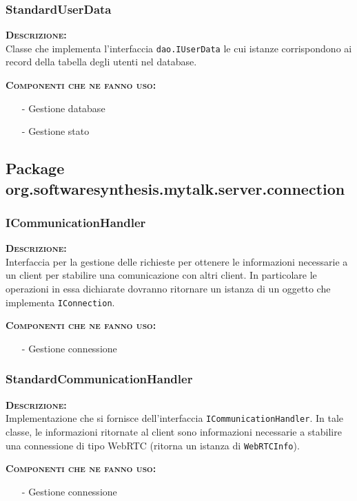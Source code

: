 \subsubsection{StandardUserData}
\begin{description}
	\item{\scshape\bfseries Descrizione:}\\
Classe che implementa l'interfaccia \texttt{dao.IUserData} le cui istanze corrispondono ai record della tabella degli utenti nel database.
	\item{\scshape\bfseries Componenti che ne fanno uso:}
	\begin{itemize}[noitemsep,nolistsep]
	  \item[-] Gestione database
	  \item[-] Gestione stato
	\end{itemize}
\end{description}

\subsection{Package org.softwaresynthesis.mytalk.server.connection}

\subsubsection{ICommunicationHandler}
\begin{description}
	\item{\scshape\bfseries Descrizione:}\\
Interfaccia per la gestione delle richieste per ottenere le informazioni necessarie a un client per stabilire una comunicazione con altri client. In particolare le operazioni in essa dichiarate dovranno ritornare un istanza di un oggetto che implementa \texttt{IConnection}.
	\item{\scshape\bfseries Componenti che ne fanno uso:}
		\begin{itemize}[noitemsep,nolistsep]
			\item[-] Gestione connessione
		\end{itemize}
\end{description}

\subsubsection{StandardCommunicationHandler}
\begin{description}
	\item{\scshape\bfseries Descrizione:}\\
Implementazione che si fornisce dell'interfaccia \texttt{ICommunicationHandler}. In tale classe, le informazioni ritornate al client sono informazioni necessarie a stabilire una connessione di tipo WebRTC (ritorna un istanza di \texttt{WebRTCInfo}).
	\item{\scshape\bfseries Componenti che ne fanno uso:}
		\begin{itemize}[noitemsep,nolistsep]
			\item[-] Gestione connessione
		\end{itemize}
\end{description}


